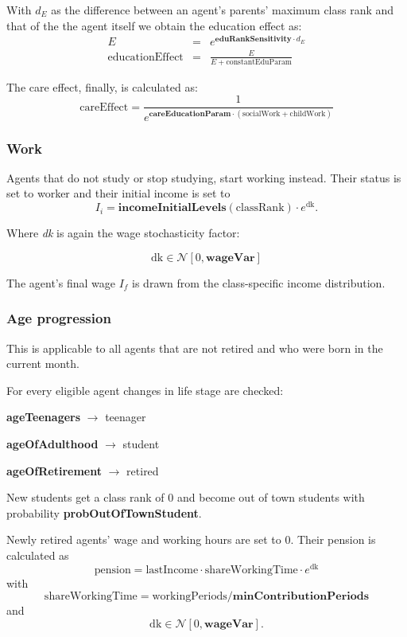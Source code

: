 \documentclass{article}
\begin{document}
With $d_E$ as the difference between an agent's parents' maximum class rank and that of the the agent 
itself we obtain the education effect as:
\begin{eqnarray*}
E &=& e^{\mathbf{eduRankSensitivity}\cdot d_E}\\
\mathrm{educationEffect} &=& \frac{E}{E + \mathrm{constantEduParam}}
\end{eqnarray*}


The care effect, finally, is calculated as:
\[
\mathrm{careEffect} = \frac{1}{e^{\mathbf{careEducationParam}\cdot(\mathrm{socialWork}+\mathrm{childWork})}}
\]

\subsubsection*{Work}

Agents that do not study or stop studying, start working instead. Their status is set to worker and their initial income is set to
\[
I_i=\mathbf{incomeInitialLevels}(\mathrm{classRank})\cdot e^\mathrm{dk}.
\]

Where \textit{dk} is again the wage stochasticity factor:

\[
\mathrm{dk} \in \mathcal{N}[0, \mathbf{wageVar}]
\]

The agent's final wage $I_f$ is drawn from the class-specific income distribution.


\subsubsection*{Age progression}

This is applicable to all agents that are not retired and who were born in the current month.

For every eligible agent changes in life
stage are checked: 

\textbf{ageTeenagers} $\rightarrow$ teenager

\textbf{ageOfAdulthood} $\rightarrow$ student

\textbf{ageOfRetirement} $\rightarrow$ retired 

New students get a class rank of 0 and become out of town students with probability \textbf{probOutOfTownStudent}. 

Newly retired agents' wage and working hours are set to 0. Their pension is calculated as 
\[
\mathrm{pension} = \mathrm{lastIncome} \cdot \mathrm{shareWorkingTime} \cdot e^\mathrm{dk}
\]
with
\[
\mathrm{shareWorkingTime} = \mathrm{workingPeriods} / \mathbf{minContributionPeriods}
\]
and
\[
\mathrm{dk} \in \mathcal{N}[0, \mathbf{wageVar}].
\]
\end{document}
